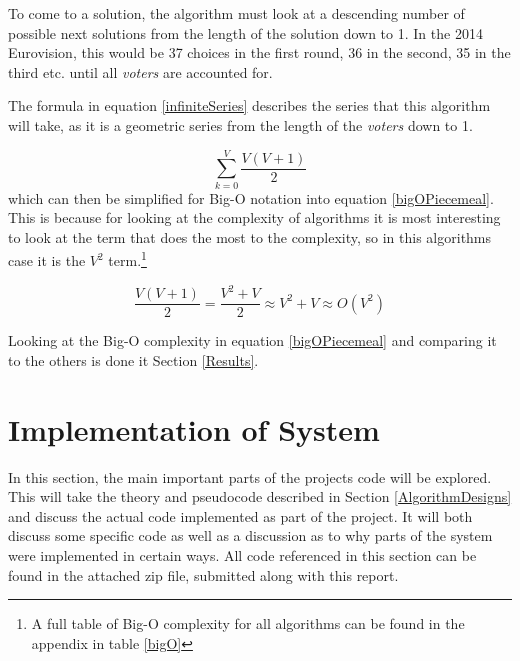 \documentclass[12pt]{report}
\begin{document}
To come to a solution, the algorithm must look at a descending number of possible next solutions from the length of the solution down to 1. In the 2014 Eurovision, this would be 37 choices in the first round, 36 in the second, 35 in the third etc. until all \textit{voters} are accounted for.

The formula in equation \ref{infiniteSeries} describes the series that this algorithm will take, as it is a geometric series from the length of the \textit{voters} down to 1.

\begin{equation}\label{infiniteSeries}
	\sum_{k=0}^{V} \frac{V(V+1)}{2}
\end{equation}
which can then be simplified for Big-O notation into equation \ref{bigOPiecemeal}. This is because for looking at the complexity of algorithms it is most interesting to look at the term that does the most to the complexity, so in this algorithms case it is the $V^2$ term.\footnote{A full table of Big-O complexity for all algorithms can be found in the appendix in table \ref{bigO}}

\begin{equation}\label{bigOPiecemeal}
	\frac{V(V+1)}{2} = \frac{V^2 + V}{2} \approx V^2 + V \approx O(V^2)
\end{equation}

Looking at the Big-O complexity in equation \ref{bigOPiecemeal} and comparing it to the others is done it Section \ref{Results}.

\clearpage
\section{Implementation of System}\label{Implementation}
In this section, the main important parts of the projects code will be explored. This will take the theory and pseudocode described in Section \ref{AlgorithmDesigns} and discuss the actual code implemented as part of the project. It will both discuss some specific code as well as a discussion as to why parts of the system were implemented in certain ways. All code referenced in this section can be found in the attached zip file, submitted along with this report.
\end{document}
